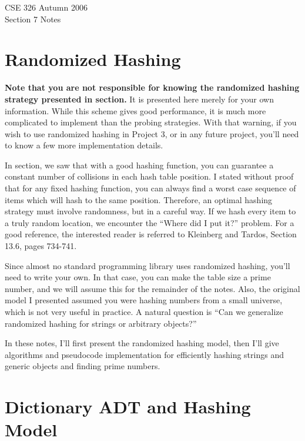 \documentclass{article}[10pth]
\begin{document}
\begin{center}
\Large{CSE 326 Autumn 2006}\\
\large{Section 7 Notes}
\end{center}

\section{Randomized Hashing}


\textbf{Note that you are not responsible for knowing the randomized hashing strategy 
presented in section.} It is presented here merely for your own information.
While this scheme gives good performance, it is much more complicated to
implement than the probing strategies. With that warning,
if you wish to use randomized hashing in Project 3, or in any future
project, you'll need to know a few more implementation details.

In section, we saw that with a good hashing function, you can guarantee a
constant number of collisions in each hash table position. I stated without
proof that for any fixed hashing function, you can always find a worst
case sequence of items which will hash to the same position. Therefore,
an optimal hashing strategy must involve randomness, but in a careful way.
If we hash every item to a truly random location, we encounter the
``Where did I put it?'' problem. For a good reference, the interested
reader is referred to Kleinberg and Tardos, Section 13.6, pages 734-741.

Since almost no
standard programming library uses randomized hashing, you'll need to write
your own. In that case, you can make the table size a prime number, and
we will assume this for the remainder of the notes.
Also, the original model I presented assumed you were hashing numbers from
a small universe, which is not very useful in practice. A natural question
is ``Can we generalize randomized hashing for strings or arbitrary
objects?''

In these notes, I'll first present the randomized hashing model, then
I'll give algorithms and pseudocode implementation for efficiently
hashing strings and generic objects and finding prime numbers.

\section{Dictionary ADT and Hashing Model}
\end{document}
